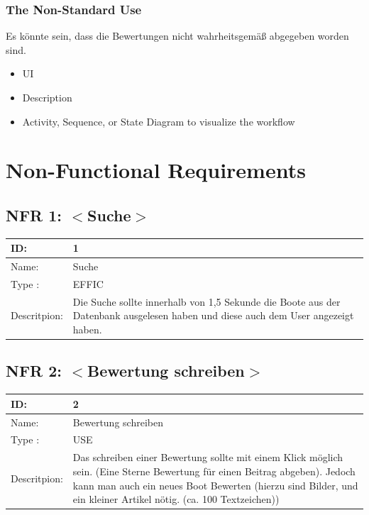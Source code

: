 \documentclass[12pt]{article}
\theoremstyle{definition}
\newenvironment{explanation}{%
   \setlength{\parindent}{0pt}
   \itshape
   \color{blue}
}{}
\begin{document}
\subsubsection{The Non-Standard Use}
\begin{explanation}
Es könnte sein, dass die Bewertungen nicht wahrheitsgemäß abgegeben worden sind.
\begin{itemize}
	\item UI
	\item Description
	\item Activity, Sequence, or State Diagram to visualize the workflow
\end{itemize}
\end{explanation}
\pagebreak

\section{Non-Functional Requirements}

\subsection{NFR 1: $<$Suche$>$}
\begin{tabular}{|p{.2\linewidth}|p{.65\linewidth}|}
\hline 
ID: & 1 \\ \hline
Name: & Suche \\ \hline
Type	: & EFFIC \\ \hline
Descritpion: &  Die Suche sollte innerhalb von 1,5 Sekunde die Boote aus der Datenbank ausgelesen haben und diese auch dem User angezeigt haben.\\ \hline
\end{tabular}

\subsection{NFR 2: $<$Bewertung schreiben$>$}
\begin{tabular}{|p{.2\linewidth}|p{.65\linewidth}|}
\hline 
ID: & 2 \\ \hline
Name: & Bewertung schreiben \\ \hline
Type	: & USE \\ \hline
Descritpion: &  Das schreiben einer Bewertung sollte mit einem Klick möglich sein. (Eine Sterne Bewertung für einen Beitrag abgeben). Jedoch kann man auch ein neues Boot Bewerten (hierzu sind Bilder, und ein kleiner Artikel nötig. (ca. 100 Textzeichen))\\ \hline
\end{tabular}
\end{document}
